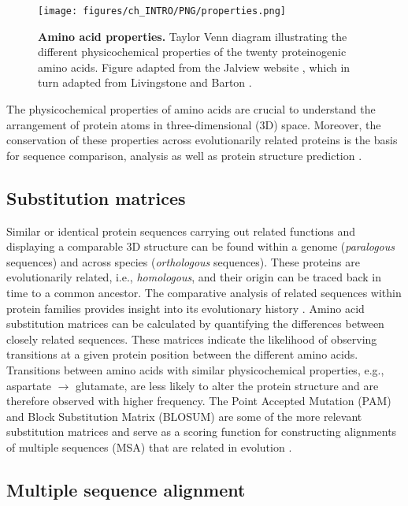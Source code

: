 \begin{figure}[htb!]
    \centering
    \texttt{[image: figures/ch\_INTRO/PNG/properties.png]}
    \caption[Amino acid properties]{\textbf{Amino acid properties.} Taylor Venn diagram illustrating the different physicochemical properties of the twenty proteinogenic amino acids. Figure adapted from the Jalview website \cite{JALVIEW}, which in turn adapted from Livingstone and Barton \cite{LIVINGSTONE_1993_MSA}.}
    \label{fig:properties}
\end{figure}

The physicochemical properties of amino acids are crucial to understand the arrangement of protein atoms in three-dimensional (3D) space. Moreover, the conservation of these properties across evolutionarily related proteins is the basis for sequence comparison, analysis as well as protein structure prediction \cite{CHOTHIA_1986_CONSERVATION}.

\subsection{Substitution matrices}

Similar or identical protein sequences carrying out related functions and displaying a comparable 3D structure can be found within a genome (\textit{paralogous} sequences) and across species (\textit{orthologous} sequences). These proteins are evolutionarily related, i.e., \textit{homologous}, and their origin can be traced back in time to a common ancestor. The comparative analysis of related sequences within protein families provides insight into its evolutionary history \cite{BARTON_1990_MSA}. Amino acid substitution matrices can be calculated by quantifying the differences between closely related sequences. These matrices indicate the likelihood of observing transitions at a given protein position between the different amino acids. Transitions between amino acids with similar physicochemical properties, e.g., aspartate $\rightarrow$ glutamate, are less likely to alter the protein structure and are therefore observed with higher frequency. The Point Accepted Mutation (PAM) \cite{DAYHOFF_1978_PAM} and Block Substitution Matrix (BLOSUM) \cite{HENIKOFF_1992_BLOSUM} are some of the more relevant substitution matrices and serve as a scoring function for constructing alignments of multiple sequences (MSA) that are related in evolution \cite{BARTON_1987_MSA}.

\subsection{Multiple sequence alignment}

